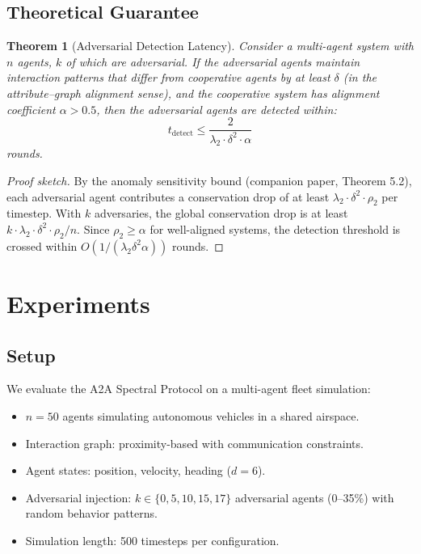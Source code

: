 \documentclass[11pt,a4paper]{article}
\newtheorem{theorem}{Theorem}[section]
\begin{document}
\subsection{Theoretical Guarantee}

\begin{theorem}[Adversarial Detection Latency]
\label{thm:detection}
Consider a multi-agent system with $n$ agents, $k$ of which are adversarial.
If the adversarial agents maintain interaction patterns that differ from
cooperative agents by at least $\delta$ (in the attribute--graph alignment
sense), and the cooperative system has alignment coefficient $\alpha > 0.5$,
then the adversarial agents are detected within:
\[
  t_{\mathrm{detect}} \leq \frac{2}{\lambda_2 \cdot \delta^2 \cdot \alpha}
\]
rounds.
\end{theorem}

\begin{proof}[Proof sketch]
By the anomaly sensitivity bound (companion paper, Theorem 5.2), each
adversarial agent contributes a conservation drop of at least
$\lambda_2 \cdot \delta^2 \cdot \rho_2$ per timestep.  With $k$ adversaries,
the global conservation drop is at least $k \cdot \lambda_2 \cdot \delta^2 \cdot
\rho_2 / n$.  Since $\rho_2 \geq \alpha$ for well-aligned systems, the
detection threshold is crossed within $O(1/(\lambda_2 \delta^2 \alpha))$ rounds.
\end{proof}

\section{Experiments}
\label{sec:experiments}

\subsection{Setup}

We evaluate the A2A Spectral Protocol on a multi-agent fleet simulation:
\begin{itemize}
  \item $n = 50$ agents simulating autonomous vehicles in a shared airspace.
  \item Interaction graph: proximity-based with communication constraints.
  \item Agent states: position, velocity, heading ($d = 6$).
  \item Adversarial injection: $k \in \{0, 5, 10, 15, 17\}$ adversarial agents
        (0--35\%) with random behavior patterns.
  \item Simulation length: 500 timesteps per configuration.
\end{itemize}
\end{document}
